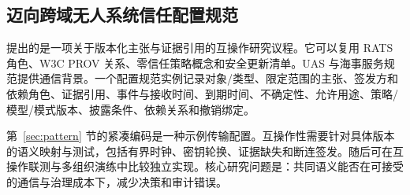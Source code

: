 \subsection{迈向跨域无人系统信任配置规范}

提出的\CDUTP{}是一项关于版本化主张与证据引用的互操作研究议程。它可以复用 RATS 角色、W3C PROV 关系、零信任策略概念和安全更新清单\citep{birkholz2023remote,w3c2013provo,rose2020zero,ietf2020suit}。UAS 与海事服务规范提供通信背景\citep{threegpp22125,threegpp22119}。一个配置规范实例记录对象/类型、限定范围的主张、签发方和依赖角色、证据引用、事件与接收时间、到期时间、不确定性、允许用途、策略/模型/模式版本、披露条件、依赖关系和撤销绑定。

第~\ref{sec:pattern} 节的紧凑编码是一种示例传输配置。互操作性需要针对具体版本的语义映射与测试，包括有界时钟、密钥轮换、证据缺失和断连签发。随后可在互操作联测与多组织演练中比较独立实现。核心研究问题是：共同语义能否在可接受的通信与治理成本下，减少决策和审计错误。
